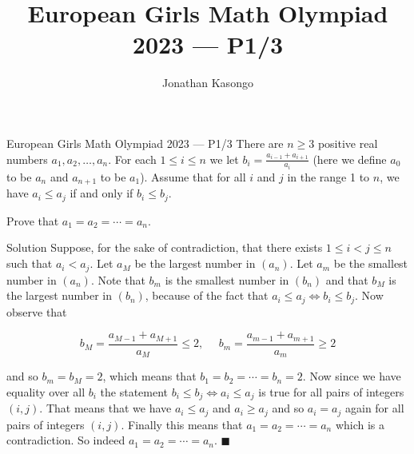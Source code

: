 \documentclass{article}
\author{Jonathan Kasongo}
\title{European Girls Math Olympiad 2023 --- P1/3}
\begin{document}
\maketitle

\begin{problem}{European Girls Math Olympiad 2023 --- P1/3}
There are $n\geq 3$ positive real numbers $a_1, a_2, \ldots, a_n$. For
each $1\leq i \leq n$ we let $b_i = \frac{a_{i-1} + a_{i+1}}{a_i}$
(here we define $a_0$ to be $a_n$ and $a_{n+1}$ to be $a_1$). Assume that
for all $i$ and $j$ in the range 1 to $n$, we have $a_i \leq a_j$ if and
only if $b_i \leq b_j$. \vspace{0.2cm}

Prove that $a_1 = a_2 = \cdots = a_n$.
\end{problem}

\begin{solution}{Solution}
Suppose, for the sake of contradiction, that there exists
$1 \leq i < j \leq n$ such that $a_i < a_j$. Let $a_M$ be the largest
number in $(a_n)$. Let $a_m$ be the smallest number in $(a_n)$. Note that
$b_m$ is the smallest number in $(b_n)$ and that $b_M$ is the largest
number in $(b_n)$, because of the fact that
$a_i \leq a_j \iff b_i \leq b_j$. Now observe that

$$
b_M = \frac{a_{M-1} + a_{M+1}}{a_M} \leq 2, \ \ \ \ \ \
b_m = \frac{a_{m-1} + a_{m+1}}{a_m} \geq 2
$$

and so $b_m = b_M = 2$, which means that $b_1 = b_2 = \cdots = b_n = 2$.
Now since we have equality over all $b_i$ the statement
$b_i \leq b_j \iff a_i \leq a_j$ is true for all pairs of integers $(i,j)$.
That means that we have $a_i \leq a_j$ and $a_i \geq a_j$ and so $a_i = a_j$
again for all pairs of integers $(i,j)$. Finally this means that
$a_1 = a_2 = \cdots = a_n$ which is a contradiction. So indeed
$a_1 = a_2 = \cdots = a_n$. $\blacksquare$
\end{solution}
\end{document}
